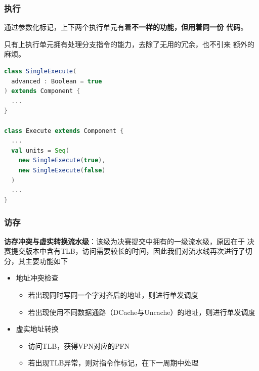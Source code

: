 \documentclass{beamer}
\begin{document}
\begin{frame}[fragile]
    \frametitle{执行}
    \begin{minipage}[c]{0.23\linewidth}
        通过参数化标记，上下两个执行单元有着\textbf{不一样的功能，但用着同一份
        代码}。

        只有上执行单元拥有处理分支指令的能力，去除了无用的冗余，也不引来
        额外的麻烦。
    \end{minipage}
    \hfill\begin{minipage}{0.70\linewidth}
\begin{lstlisting}[language=scala]
class SingleExecute(
  advanced : Boolean = true
) extends Component {
  ...
}

class Execute extends Component {
  ...
  val units = Seq(
    new SingleExecute(true),
    new SingleExecute(false)
  )
  ...
}
\end{lstlisting}
    \end{minipage}
\end{frame}

\begin{frame}
    \frametitle{访存}
    \textbf{访存冲突与虚实转换流水级}：该级为决赛提交中拥有的一级流水级，原因在于
    决赛提交版本中含有TLB，访问需要较长的时间，因此我们对流水线再次进行了切分，其主要功能如下
    \begin{itemize}
        \item 地址冲突检查\begin{itemize}
            \item 若出现同时写同一个字对齐后的地址，则进行单发调度
            \item 若出现使用不同数据通路（DCache与Uncache）的地址，则进行单发调度
        \end{itemize}
        \item 虚实地址转换\begin{itemize}
            \item 访问TLB，获得VPN对应的PFN
            \item 若出现TLB异常，则对指令作标记，在下一周期中处理
        \end{itemize}
    \end{itemize}
\end{frame}
\end{document}
